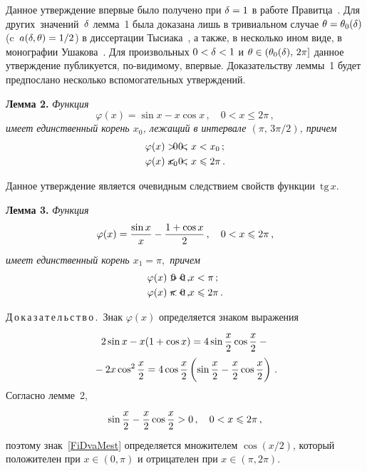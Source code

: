 \begin{multicols}{2}
Данное утверждение впервые было получено при $\delta=1$ в работе
Правитца~\cite{Prawitz1973}. Для других~зна\-че\-ний~$\delta$
лемма~1 была доказана лишь в три\-виаль\-ном случае
${\theta=\theta_0(\delta)}$ (c~${a(\delta,\theta)=1/2}$) в диссертации
Тысиака~\cite{Tysiak1983}, а также, в несколько ином виде, в
монографии Ушакова~\cite{Ushakov1999}. Для произвольных\linebreak
${0<\delta<1}$ и ${\theta\in(\theta_0(\delta),\,2\pi]}$ данное утверждение
пуб\-ли\-ку\-ет\-ся, по-видимому, впервые. Доказательству
леммы~1 будет предпослано несколько вспомогательных
утверждений.

\medskip

\noindent
\textbf{Лемма 2.}
\label{FiOdin}
\textit{Функция}
$$
\varphi(x)=\sin x -x\cos x\,,\quad 0<x\le2\pi\,,
$$
\textit{имеет единственный корень $x_0$, лежащий в интервале
$\left(\pi,\,3\pi/2\right)$, причем}
\begin{align*}
  \varphi(x)&>0\,, &\hspace*{-30pt}  0&<x<x_0\,; \\
  \varphi(x)&<0\,, &\hspace*{-30pt}  x_0&<x\le 2\pi\,.
\end{align*}

\medskip

Данное утверждение является очевидным следствием свойств функции~$\mathrm{tg}\,x$.

\medskip

\noindent
\textbf{Лемма 3.}
\label{FiDva}
\textit{Функция}
$$
\varphi(x)=\displaystyle\frac{\displaystyle \sin x\mathstrut}{\displaystyle x\mathstrut} -\displaystyle\frac{\displaystyle 1+\cos x\mathstrut}{\displaystyle 2\mathstrut}\,,\quad 0<x\leqslant 2\pi\,,
$$
\textit{имеет единственный корень $x_1=\pi,$ причем}
\begin{align*}
  \varphi(x)&>0\,, &\hspace*{-30pt}0&<x<\pi\,; \\
  \varphi(x)&<0\,, &\hspace*{-30pt} \pi&<x\le2\pi\,.
\end{align*}

\medskip

\noindent
Д\,о\,к\,а\,з\,а\,т\,е\,л\,ь\,с\,т\,в\,о\,.\ Знак $\varphi(x)$ определяется знаком выражения
\begin{multline}
\label{FiDvaMest}
2\sin x-x(1+\cos x)= 4\sin\displaystyle\frac{\displaystyle x\mathstrut}{\displaystyle 2\mathstrut} \cos\displaystyle\frac{\displaystyle x\mathstrut}{\displaystyle 2\mathstrut}-{}\\
{}-2x\cos^2\displaystyle\frac{\displaystyle x\mathstrut}{\displaystyle 2\mathstrut}=
4\cos\displaystyle\frac{\displaystyle x\mathstrut}{\displaystyle 2\mathstrut}\left(\sin\displaystyle\frac{\displaystyle x\mathstrut}{\displaystyle 2\mathstrut}-\displaystyle\frac{\displaystyle x\mathstrut}{\displaystyle 2\mathstrut}\cos\displaystyle\frac{\displaystyle x\mathstrut}{\displaystyle 2\mathstrut}\right)\,.
\end{multline}
Согласно лемме~2,
$$
\sin\displaystyle\frac{\displaystyle x\mathstrut}{\displaystyle 2\mathstrut}-\displaystyle\frac{\displaystyle x\mathstrut}{\displaystyle 2\mathstrut}\cos\displaystyle\frac{\displaystyle x\mathstrut}{\displaystyle 2\mathstrut}>0\,,\quad 0<x\leqslant 2\pi\,,
$$
поэтому знак~\eqref{FiDvaMest} определяется множителем $\cos(x/2)$,
который положителен при ${x\in(0,\pi)}$ и отрицателен при
$x\in(\pi,2\pi)$.


\end{multicols}
